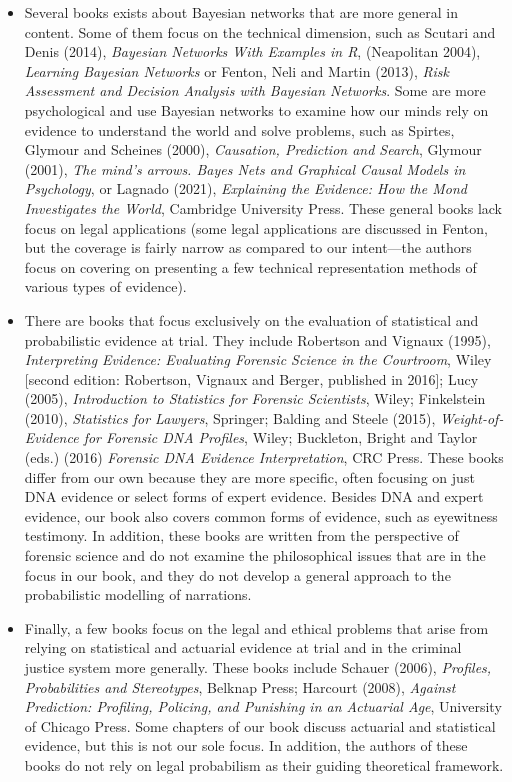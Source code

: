 \documentclass[
  10pt,
  dvipsnames,enabledeprecatedfontcommands]{scrartcl}
\begin{document}
\begin{itemize}
\item Several books exists about Bayesian networks that are more general in content. Some of them focus on the technical dimension,  such as Scutari and  Denis (2014), \textit{Bayesian Networks With Examples in R}, (Neapolitan 2004), \emph{Learning Bayesian Networks} or Fenton, Neli and Martin (2013), \emph{Risk Assessment and Decision Analysis with Bayesian Networks}. Some are more psychological and use Bayesian networks to examine how our minds rely on evidence to understand the world and solve problems, such as Spirtes, Glymour and Scheines (2000), \emph{Causation, Prediction and Search}, Glymour (2001),  \emph{The mind's arrows. Bayes Nets and Graphical Causal Models in Psychology}, or Lagnado (2021), \textit{Explaining the Evidence: How the Mond Investigates the World}, Cambridge University Press.  These general books  lack  focus on legal applications (some legal applications are discussed in Fenton, but the coverage is fairly narrow as compared to our intent---the authors focus on covering on presenting a few technical representation methods of various types of evidence). 



\item There are books that focus exclusively on the evaluation of statistical and probabilistic evidence at trial. They include Robertson and Vignaux (1995), \textit{Interpreting Evidence: Evaluating Forensic Science in the Courtroom}, Wiley [second edition:  Robertson, Vignaux and Berger, published in 2016];  Lucy (2005), \textit{Introduction to Statistics for Forensic Scientists}, Wiley;  Finkelstein (2010), \textit{Statistics for Lawyers}, Springer; Balding and Steele (2015), \textit{Weight-of-Evidence for Forensic DNA Profiles}, Wiley;  Buckleton, Bright and Taylor (eds.) (2016) \textit{Forensic DNA Evidence Interpretation}, CRC Press. These books differ from our own because they are more specific, often focusing on just  DNA evidence or select forms of expert evidence. Besides DNA and expert evidence, our book also covers common forms of evidence, such as eyewitness testimony. In addition, these books are written from the perspective of forensic science and do not examine the   philosophical issues that are in the focus in our book, and they do not develop a general approach to the probabilistic modelling of narrations.

\item  Finally, a few books focus on the legal and ethical problems that arise from relying on statistical and actuarial evidence at trial and in the criminal justice system more generally. These books include Schauer (2006), \textit{Profiles, Probabilities and Stereotypes}, Belknap Press; Harcourt (2008), \textit{Against Prediction: Profiling, Policing, and Punishing in an Actuarial Age}, University of Chicago Press. Some chapters of our book discuss  actuarial and statistical evidence, but this is not our sole focus. In addition, the authors of these books do not rely on legal probabilism as their guiding theoretical framework.


\end{itemize}
\end{document}
